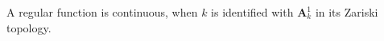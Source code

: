 A regular function is continuous, when $k$ is identified with $\mathbf{A}_k^1$ in its Zariski topology.
